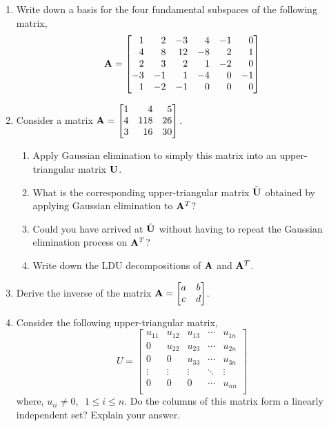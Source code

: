 \begin{enumerate}[resume]
    \item Write down a basis for the four fundamental subspaces of the following matrix,
    \[ \mf{A} = \begin{bmatrix*}[r]
    1 & 2 & -3 & 4 & -1 & 0 \\
    4 & 8 & 12 & -8 & 2 & 1 \\
    2 & 3 & 2 & 1 & -2 & 0 \\
    -3 & -1 & 1 & -4 & 0 & -1 \\
    1 & -2 & -1 & 0 & 0 & 0 \\
    \end{bmatrix*} \]
    
    \item Consider a matrix $\mf{A} = \begin{bmatrix*}[r] 1 & 4 & 5\\ 4 & 118 & 26\\3 & 16 & 30\end{bmatrix*}$.
    \begin{enumerate}
        \item Apply Gaussian elimination to simply this matrix into an upper-triangular matrix $\mathbf{U}$.
        \item What is the corresponding upper-triangular matrix $\tilde{\mathbf{U}}$ obtained by applying Gaussian elimination to $\mathbf{A}^T$? 
        \item Could you have arrived at $\tilde{\mathbf{U}}$ without having to repeat the Gaussian elimination process on $\mathbf{A}^T$?
        \item Write down the LDU decompositions of $\mathbf{A}$ and $\mathbf{A}^T$.
    \end{enumerate} 

    \item Derive the inverse of the matrix $\mathbf{A} = \begin{bmatrix}a & b\\c & d\end{bmatrix}$.
    
    \item Consider the following upper-triangular matrix, 
    $$U = \begin{bmatrix}
    u_{11} & u_{12} & u_{13} & \cdots & u_{1n}\\
    0 & u_{22} & u_{23} & \cdots & u_{2n}\\
    0 & 0 & u_{33} & \cdots & u_{3n}\\
    \vdots & \vdots & \vdots & \ddots & \vdots\\
    0 & 0 & 0 & \cdots & u_{nn}\\\end{bmatrix}$$
    where, $u_{ii} \neq 0, \,\,\, 1 \leq i \leq n$. Do the columns of this matrix form a linearly independent set? Explain your answer.


\end{enumerate}
